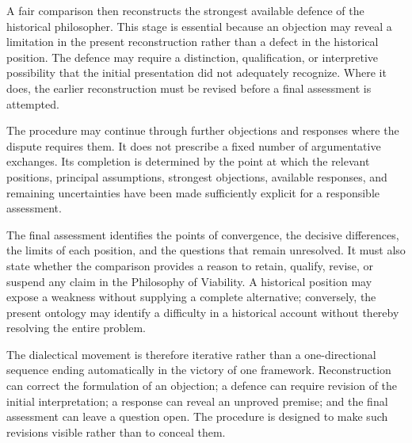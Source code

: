 \label{para:VS.B01.P01.C08.S01.SS04.P006}
A fair comparison then reconstructs the strongest available
defence of the historical philosopher. This stage is
essential because an objection may reveal a limitation in
the present reconstruction rather than a defect in the
historical position. The defence may require a distinction,
qualification, or interpretive possibility that the initial
presentation did not adequately recognize. Where it does,
the earlier reconstruction must be revised before a final
assessment is attempted.

\label{para:VS.B01.P01.C08.S01.SS04.P007}
The procedure may continue through further objections and
responses where the dispute requires them. It does not
prescribe a fixed number of argumentative exchanges. Its
completion is determined by the point at which the relevant
positions, principal assumptions, strongest objections,
available responses, and remaining uncertainties have been
made sufficiently explicit for a responsible assessment.

\label{para:VS.B01.P01.C08.S01.SS04.P008}
The final assessment identifies the points of convergence,
the decisive differences, the limits of each position, and
the questions that remain unresolved. It must also state
whether the comparison provides a reason to retain, qualify,
revise, or suspend any claim in the Philosophy of Viability.
A historical position may expose a weakness without
supplying a complete alternative; conversely, the present
ontology may identify a difficulty in a historical account
without thereby resolving the entire problem.

\label{para:VS.B01.P01.C08.S01.SS04.P009}
The dialectical movement is therefore iterative rather than
a one-directional sequence ending automatically in the
victory of one framework. Reconstruction can correct the
formulation of an objection; a defence can require revision
of the initial interpretation; a response can reveal an
unproved premise; and the final assessment can leave a
question open. The procedure is designed to make such
revisions visible rather than to conceal them.

\begin{center}

\end{center}

